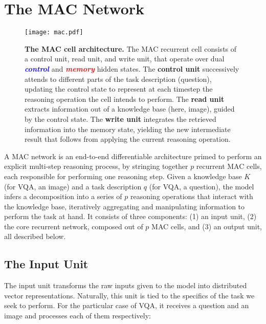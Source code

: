 \documentclass[fleqn]{article}
\begin{document}
\section{The MAC Network}
\label{sec:model}

\begin{figure}[t]

\centering
\texttt{[image: mac.pdf]}

\caption{\textbf{The MAC cell architecture.} The MAC recurrent cell consists of a control unit, read unit, and write unit, that operate over dual \textit{\textbf{\textcolor{Blue}{control}}} and \textit{\textbf{\textcolor{Red}{memory}}} hidden states. The \textbf{control unit} successively attends to different parts of the task description (question), updating the control state to represent at each timestep the reasoning operation the cell intends to perform. The \textbf{read unit} extracts information out of a knowledge base (here, image), guided by the control state. The  \textbf{write unit} integrates the retrieved information into the memory state, yielding the new intermediate result that follows from applying the current reasoning operation.}
\label{fig:mac}
\end{figure}

A MAC network is an end-to-end differentiable architecture primed to perform an explicit multi-step reasoning process, by stringing together \(p\) recurrent MAC cells, each responsible for performing one reasoning step. Given a knowledge base \(K\) (for VQA, an image) and a task description \(q\) (for VQA, a question), the model infers a decomposition into a series of \(p\) reasoning operations that interact with the knowledge base, iteratively aggregating and manipulating information to perform the task at hand. It consists of three components: (1) an input unit, (2) the core recurrent network, composed out of \(p\) MAC cells, and (3) an output unit, all described below.

\subsection{The Input Unit}

The input unit transforms the raw inputs given to the model into distributed vector representations. Naturally, this unit is tied to the specifics of the task we seek to perform. For the particular case of VQA, it receives a  question and an image and processes each of them respectively: 
\end{document}
